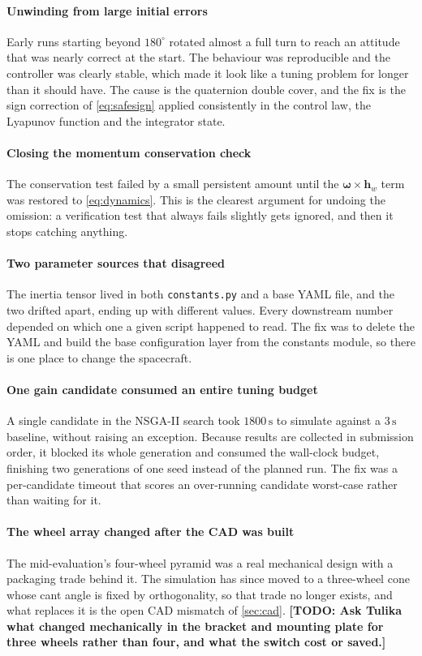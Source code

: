 \documentclass[conference,10pt,a4paper]{IEEEtran}
\newcommand{\TODO}[1]{\textbf{[TODO: #1]}}
\newcommand{\TODO}[1]{}
\newcommand{\vect}[1]{\bm{#1}}
\newcommand{\unit}[1]{\ensuremath{\,\mathrm{#1}}}
\begin{document}
\paragraph{Unwinding from large initial errors}
Early runs starting beyond $180^\circ$ rotated almost a full turn to reach an
attitude that was nearly correct at the start. The behaviour was reproducible
and the controller was clearly stable, which made it look like a tuning problem
for longer than it should have. The cause is the quaternion double cover, and
the fix is the sign correction of \cref{eq:safesign} applied consistently in
the control law, the Lyapunov function and the integrator state.

\paragraph{Closing the momentum conservation check}
The conservation test failed by a small persistent amount until the
$\vect{\omega}\times\vect{h}_w$ term was restored to \cref{eq:dynamics}. This
is the clearest argument for undoing the omission: a verification test that
always fails slightly gets ignored, and then it stops catching anything.

\paragraph{Two parameter sources that disagreed}
The inertia tensor lived in both \texttt{constants.py} and a base YAML file,
and the two drifted apart, ending up with different values. Every downstream
number depended on which one a given script happened to read. The fix was to
delete the YAML and build the base configuration layer from the constants
module, so there is one place to change the spacecraft.

\paragraph{One gain candidate consumed an entire tuning budget}
A single candidate in the NSGA-II search took $1800\unit{s}$ to simulate
against a $3\unit{s}$ baseline, without raising an exception. Because results
are collected in submission order, it blocked its whole generation and consumed
the wall-clock budget, finishing two generations of one seed instead of the
planned run. The fix was a per-candidate timeout that scores an over-running
candidate worst-case rather than waiting for it.

\paragraph{The wheel array changed after the CAD was built}
The mid-evaluation's four-wheel pyramid was a real mechanical design with a
packaging trade behind it. The simulation has since moved to a three-wheel cone
whose cant angle is fixed by orthogonality, so that trade no longer exists, and
what replaces it is the open CAD mismatch of \cref{sec:cad}. \TODO{Ask Tulika
what changed mechanically in the bracket and mounting plate for three wheels
rather than four, and what the switch cost or saved.}
\end{document}
